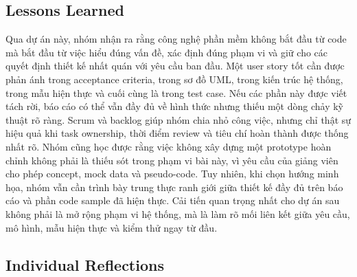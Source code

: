 \subsection{Lessons Learned}

Qua dự án này, nhóm nhận ra rằng công nghệ phần mềm không bắt đầu từ code mà bắt đầu từ việc hiểu đúng vấn đề, xác định đúng phạm vi và giữ cho các quyết định thiết kế nhất quán với yêu cầu ban đầu. Một user story tốt cần được phản ánh trong acceptance criteria, trong sơ đồ UML, trong kiến trúc hệ thống, trong mẫu hiện thực và cuối cùng là trong test case. Nếu các phần này được viết tách rời, báo cáo có thể vẫn đầy đủ về hình thức nhưng thiếu một dòng chảy kỹ thuật rõ ràng. Scrum và backlog giúp nhóm chia nhỏ công việc, nhưng chỉ thật sự hiệu quả khi task ownership, thời điểm review và tiêu chí hoàn thành được thống nhất rõ. Nhóm cũng học được rằng việc không xây dựng một prototype hoàn chỉnh không phải là thiếu sót trong phạm vi bài này, vì yêu cầu của giảng viên cho phép concept, mock data và pseudo-code. Tuy nhiên, khi chọn hướng minh họa, nhóm vẫn cần trình bày trung thực ranh giới giữa thiết kế đầy đủ trên báo cáo và phần code sample đã hiện thực. Cải tiến quan trọng nhất cho dự án sau không phải là mở rộng phạm vi hệ thống, mà là làm rõ mối liên kết giữa yêu cầu, mô hình, mẫu hiện thực và kiểm thử ngay từ đầu.

\subsection{Individual Reflections}

